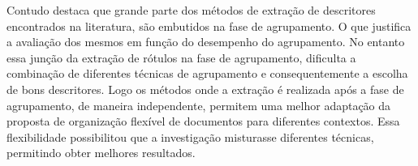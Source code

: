 Contudo \cite{Nogueira2013} destaca que grande parte dos métodos de extração de descritores 
encontrados na literatura, são embutidos na fase de agrupamento. O que justifica a avaliação 
dos mesmos em função do desempenho do agrupamento. No entanto essa junção da extração de rótulos
na fase de agrupamento, dificulta a combinação de diferentes técnicas de agrupamento e 
consequentemente a escolha de bons descritores. Logo os métodos onde a extração é realizada 
após a fase de agrupamento,
de maneira independente, permitem uma melhor adaptação da proposta de organização flexível de 
documentos para diferentes contextos. Essa flexibilidade possibilitou que a investigação
misturasse diferentes técnicas, permitindo obter melhores resultados.





